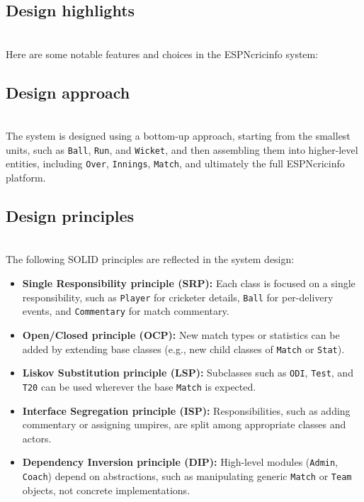 \subsection{Design highlights}\label{fbDAS09DN7gdf9sb7a2hT}
\\
Here are some notable features and choices in the ESPNcricinfo system:

\subsection{Design approach}\label{ofcRmrchLhX2hcxNiJizJ}
\\
The system is designed using a bottom-up approach, starting from the smallest units, such as \texttt{Ball}, \texttt{Run}, and \texttt{Wicket}, and then assembling them into higher-level entities, including \texttt{Over}, \texttt{Innings}, \texttt{Match}, and ultimately the full ESPNcricinfo platform.

\subsection{Design principles}\label{84e-UJSjAZE1xbwKKnUQn}
\\
The following SOLID principles are reflected in the system design:

\begin{itemize}
\item
\protect{}\label{lTw-EQRmGwxc5kSQY0D4S}
\textbf{Single Responsibility principle (SRP):} Each class is focused on a single responsibility, such as \texttt{Player} for cricketer details, \texttt{Ball} for per-delivery events, and \texttt{Commentary} for match commentary.
\item
\protect{}\label{3XVMykXFBVRqMh78FqJIx}
\textbf{Open/Closed principle (OCP):} New match types or statistics can be added by extending base classes (e.g., new child classes of \texttt{Match} or \texttt{Stat}).
\item
\protect{}\label{EvR_RVxQeTud51IhlQ8m3}
\textbf{Liskov Substitution principle (LSP):} Subclasses such as \texttt{ODI}, \texttt{Test}, and \texttt{T20} can be used wherever the base \texttt{Match} is expected.
\item
\protect{}\label{Ybl1QcMi5wr1kNyjld3Aj}
\textbf{Interface Segregation principle (ISP):} Responsibilities, such as adding commentary or assigning umpires, are split among appropriate classes and actors.
\item
\protect{}\label{0gib8bVaOFCbkyfGb7j0n}
\textbf{Dependency Inversion principle (DIP):} High-level modules (\texttt{Admin}, \texttt{Coach}) depend on abstractions, such as manipulating generic \texttt{Match} or \texttt{Team} objects, not concrete implementations.
\end{itemize}

